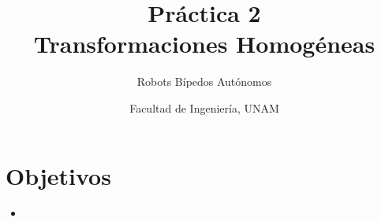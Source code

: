 \documentclass[letterpaper,12pt]{article}
\title{Práctica 2 \\ Transformaciones Homogéneas}
\author{Robots Bípedos Autónomos}
\date{Facultad de Ingeniería, UNAM}
\begin{document}
\renewcommand{\tablename}{Tabla}
\maketitle
\section*{Objetivos}
\begin{itemize}
\item 
\end{itemize}
\end{document}
